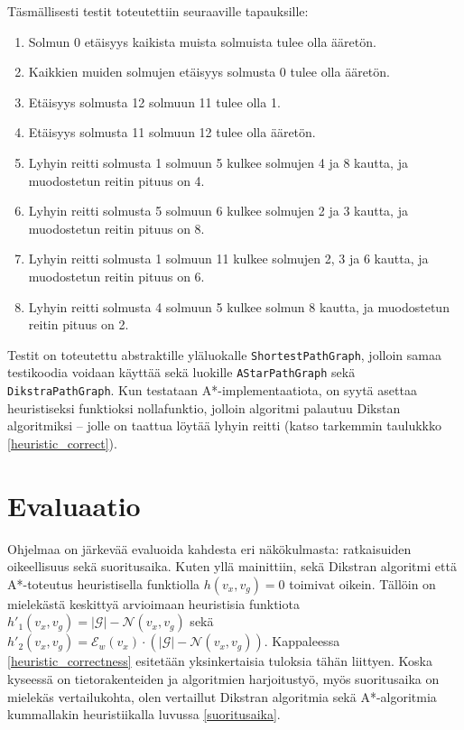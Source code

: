 \documentclass[10pt,a4paper]{article}
\begin{document}
Täsmällisesti testit toteutettiin seuraaville tapauksille:

\begin{enumerate}
\item Solmun 0 etäisyys kaikista muista solmuista tulee olla ääretön.
\item Kaikkien muiden solmujen etäisyys solmusta 0 tulee olla ääretön.
\item Etäisyys solmusta 12 solmuun 11 tulee olla 1.
\item Etäisyys solmusta 11 solmuun 12 tulee olla ääretön.
\item Lyhyin reitti solmusta 1 solmuun 5 kulkee solmujen 4 ja 8 kautta, ja muodostetun reitin pituus on 4.
\item Lyhyin reitti solmusta 5 solmuun 6 kulkee solmujen 2 ja 3 kautta, ja muodostetun reitin pituus on 8.
\item Lyhyin reitti solmusta 1 solmuun 11 kulkee solmujen 2, 3 ja 6 kautta, ja muodostetun reitin pituus on 6.
\item Lyhyin reitti solmusta 4 solmuun 5 kulkee solmun 8 kautta, ja muodostetun reitin pituus on 2.
\label{network_test}
\end{enumerate}

Testit on toteutettu abstraktille yläluokalle \texttt{ShortestPathGraph}, jolloin samaa testikoodia voidaan käyttää sekä luokille \texttt{AStarPathGraph} sekä \texttt{DikstraPathGraph}. Kun testataan A*-implementaatiota, on syytä asettaa heuristiseksi funktioksi nollafunktio, jolloin algoritmi palautuu Dikstan algoritmiksi -- jolle on taattua löytää lyhyin reitti (katso tarkemmin taulukkko \ref{heuristic_correct}).

\section{Evaluaatio}

Ohjelmaa on järkevää evaluoida kahdesta eri näkökulmasta: ratkaisuiden oikeellisuus sekä suoritusaika. Kuten yllä mainittiin, sekä Dikstran algoritmi että A*-toteutus heuristisella funktiolla $h(v_x,v_g) = 0$ toimivat oikein. Tällöin on mielekästä keskittyä arvioimaan heuristisia funktiota $h'_1( v_x, v_g ) = |\mathcal{G}| - \mathcal{N}( v_x , v_g )$ sekä $ h'_2( v_x, v_g ) = \mathcal{E}_w ( v_x ) \cdot ( |\mathcal{G}| - \mathcal{N}( v_x , v_g ) ) $. Kappaleessa \ref{heuristic_correctness} esitetään yksinkertaisia tuloksia tähän liittyen. Koska kyseessä on tietorakenteiden ja algoritmien harjoitustyö, myös suoritusaika on mielekäs vertailukohta, olen vertaillut Dikstran algoritmia sekä A*-algoritmia kummallakin heuristiikalla luvussa \ref{suoritusaika}.
\end{document}
